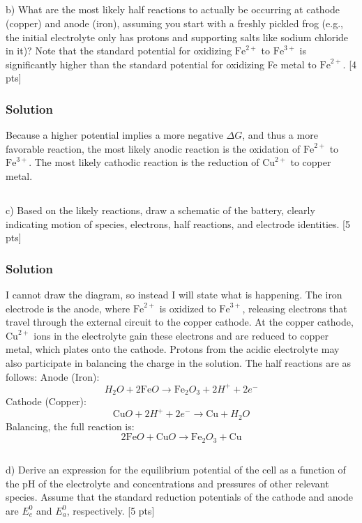 \documentclass[12pt]{article}
\begin{document}
\subsection{}
b) What are the most likely half reactions to actually be occurring at cathode (copper) and anode (iron), assuming you start with a freshly pickled frog (e.g., the initial electrolyte only has protons and supporting salts like sodium chloride in it)? Note that the standard potential for oxidizing $\mathrm{Fe}^{2+}$ to $\mathrm{Fe}^{3+}$ is significantly higher than the standard potential for oxidizing Fe metal to $\mathrm{Fe}^{2+}$. [4 pts]\\[0pt]
\subsubsection{Solution}
Because a higher potential implies a more negative $\Delta G$, and thus a more favorable reaction, the most likely anodic reaction is the oxidation of $\mathrm{Fe}^{2+}$ to $\mathrm{Fe}^{3+}$. The most likely cathodic reaction is the reduction of $\mathrm{Cu}^{2+}$ to copper metal.
\subsection{}
c) Based on the likely reactions, draw a schematic of the battery, clearly indicating motion of species, electrons, half reactions, and electrode identities. [5 pts]\\
\subsubsection{Solution}
I cannot draw the diagram, so instead I will state what is happening. The iron electrode is the anode, where $\mathrm{Fe}^{2+}$ is oxidized to $\mathrm{Fe}^{3+}$, releasing electrons that travel through the external circuit to the copper cathode. At the copper cathode, $\mathrm{Cu}^{2+}$ ions in the electrolyte gain these electrons and are reduced to copper metal, which plates onto the cathode. Protons from the acidic electrolyte may also participate in balancing the charge in the solution. The half reactions are as follows:
Anode (Iron): \[H_2O + 2\mathrm{Fe}O \rightarrow \mathrm{Fe}_2O_3 + 2H^+ + 2e^-\]
Cathode (Copper): \[\mathrm{Cu}O + 2H^+ + 2e^- \rightarrow \mathrm{Cu} + H_2O\]
Balancing, the full reaction is:
\[2\mathrm{Fe}O + \mathrm{Cu}O \rightarrow \mathrm{Fe}_2O_3 + \mathrm{Cu}\]
\subsection{}
d) Derive an expression for the equilibrium potential of the cell as a function of the pH of the electrolyte and concentrations and pressures of other relevant species. Assume that the standard reduction potentials of the cathode and anode are $E_{c}^{0}$ and $E_{a}^{0}$, respectively. [5 pts]\\[0pt]
\end{document}
